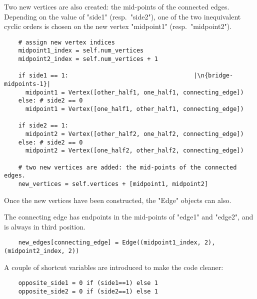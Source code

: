 Two new vertices are also created: the mid-points of the connected
edges. Depending on the value of "side1" (resp.~"side2"), one of the
two inequivalent cyclic orders is chosen on the new vertex "midpoint1"
(resp.~"midpoint2").
\begin{lstlisting}
    # assign new vertex indices
    midpoint1_index = self.num_vertices
    midpoint2_index = self.num_vertices + 1

    if side1 == 1:                                   |\n{bridge-midpoints-1}|
      midpoint1 = Vertex([other_half1, one_half1, connecting_edge])
    else: # side2 == 0
      midpoint1 = Vertex([one_half1, other_half1, connecting_edge])

    if side2 == 1:
      midpoint2 = Vertex([other_half2, one_half2, connecting_edge])
    else: # side2 == 0
      midpoint2 = Vertex([one_half2, other_half2, connecting_edge])

    # two new vertices are added: the mid-points of the connected edges.
    new_vertices = self.vertices + [midpoint1, midpoint2]

\end{lstlisting}
Once the new vertices have been constructed, the "Edge" objects can
also.

The connecting edge has endpoints in the mid-points of
"edge1" and "edge2", and is always in third position.
\begin{lstlisting}
    new_edges[connecting_edge] = Edge((midpoint1_index, 2), (midpoint2_index, 2))

\end{lstlisting}
A couple of shortcut variables are introduced to make the code cleaner:
\begin{lstlisting}
    opposite_side1 = 0 if (side1==1) else 1
    opposite_side2 = 0 if (side2==1) else 1

\end{lstlisting}

